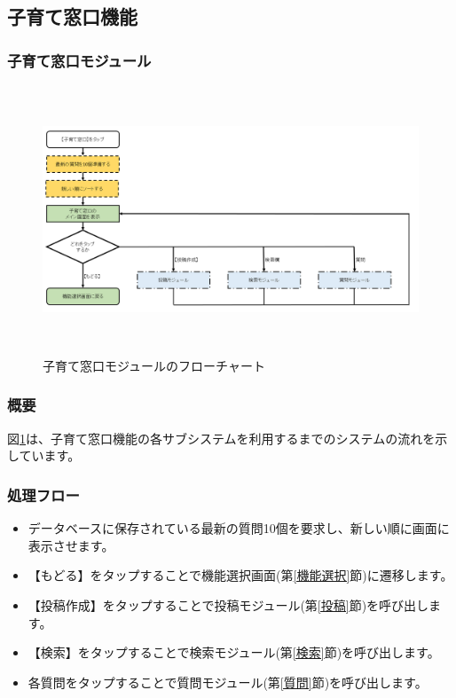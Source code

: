 \documentclass[a4j]{jarticle}
\begin{document}
\subsection{子育て窓口機能}
\subsubsection{子育て窓口モジュール\label{子育て窓口}} %

\begin{figure}[H]
    \begin{center}
      \includegraphics[height = 8.0cm]{子育て窓口_全体.png} %
    \caption {子育て窓口モジュールのフローチャート}
    \label{子育て窓口_全体}
    \end{center}
\end{figure}

\subsubsection*{概要}
図\ref{子育て窓口_全体}は、子育て窓口機能の各サブシステムを利用するまでのシステムの流れを示しています。
\subsubsection*{処理フロー}
\begin{itemize}
\item データベースに保存されている最新の質問10個を要求し、新しい順に画面に表示させます。
\item 【もどる】をタップすることで機能選択画面(第\ref{機能選択}節)に遷移します。
\item 【投稿作成】をタップすることで投稿モジュール(第\ref{投稿}節)を呼び出します。
\item 【検索】をタップすることで検索モジュール(第\ref{検索}節)を呼び出します。
\item 各質問をタップすることで質問モジュール(第\ref{質問}節)を呼び出します。

\end{itemize}
\end{document}
